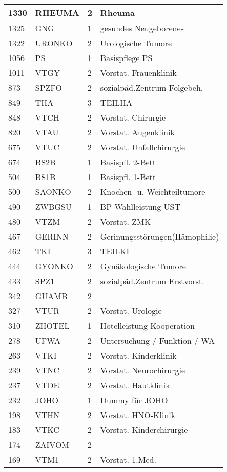 \begin{center}
\begin{longtable}{|p{2.3cm}|p{2.3cm}|p{2.2cm}|p{6cm}|}
1330 & RHEUMA & 2 & Rheuma \\ \hline
1325 & GNG & 1 & gesundes Neugeborenes \\ \hline
1322 & URONKO & 2 & Urologische Tumore \\ \hline
1056 & PS & 1 & Basispflege PS \\ \hline
1011 & VTGY & 2 & Vorstat. Frauenklinik \\ \hline
873 & SPZFO & 2 & sozialpäd.Zentrum Folgebeh. \\ \hline
849 & THA & 3 & TEILHA \\ \hline
848 & VTCH & 2 & Vorstat. Chirurgie \\ \hline
820 & VTAU & 2 & Vorstat. Augenklinik \\ \hline
675 & VTUC & 2 & Vorstat. Unfallchirurgie \\ \hline
674 & BS2B & 1 & Basispfl. 2-Bett \\ \hline
504 & BS1B & 1 & Basispfl. 1-Bett \\ \hline
500 & SAONKO & 2 & Knochen- u. Weichteiltumore \\ \hline
490 & ZWBGSU & 1 & BP Wahlleistung UST \\ \hline
480 & VTZM & 2 & Vorstat. ZMK \\ \hline
467 & GERINN & 2 & Gerinungsstörungen(Hämophilie) \\ \hline
462 & TKI & 3 & TEILKI \\ \hline
444 & GYONKO & 2 & Gynäkologische Tumore \\ \hline
433 & SPZ1 & 2 & sozialpäd.Zentrum Erstvorst. \\ \hline
342 & GUAMB & 2 &  \\ \hline
327 & VTUR & 2 & Vorstat. Urologie \\ \hline
310 & ZHOTEL & 1 & Hotelleistung Kooperation \\ \hline
278 & UFWA & 2 & Untersuchung / Funktion / WA \\ \hline
263 & VTKI & 2 & Vorstat. Kinderklinik \\ \hline
239 & VTNC & 2 & Vorstat. Neurochirurgie \\ \hline
237 & VTDE & 2 & Vorstat. Hautklinik \\ \hline
232 & JOHO & 1 & Dummy für JOHO \\ \hline
198 & VTHN & 2 & Vorstat. HNO-Klinik \\ \hline
183 & VTKC & 2 & Vorstat. Kinderchirurgie \\ \hline
174 & ZAIVOM & 2 &  \\ \hline
169 & VTM1 & 2 & Vorstat. 1.Med. \\ \hline

\end{longtable}
\end{center}
